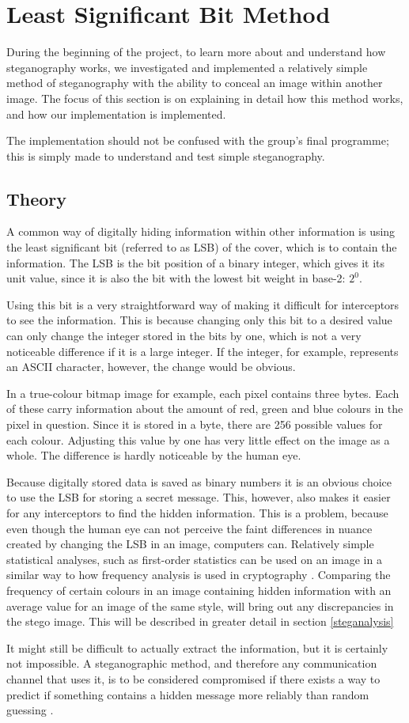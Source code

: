 \section{Least Significant Bit Method}
During the beginning of the project, to learn more about and understand how steganography works, we investigated and implemented a relatively simple method of steganography with the ability to conceal an image within another image.
The focus of this section is on explaining in detail how this method works, and how our implementation is implemented.

The implementation should not be confused with the group's final programme; this is simply made to understand and test simple steganography.

\subsection{Theory}
A common way of digitally hiding information within other information is using the least significant bit (referred to as LSB) of the cover, which is to contain the information.
The LSB is the bit position of a binary integer, which gives it its unit value, since it is also the bit with the lowest bit weight in base-2: $2^0$.

Using this bit is a very straightforward way of making it difficult for interceptors to see the information.
This is because changing only this bit to a desired value can only change the integer stored in the bits by one, which is not a very noticeable difference if it is a large integer.
If the integer, for example, represents an ASCII character, however, the change would be obvious.

In a true-colour bitmap image for example, each pixel contains three bytes.
Each of these carry information about the amount of red, green and blue colours in the pixel in question.
Since it is stored in a byte, there are 256 possible values for each colour.
Adjusting this value by one has very little effect on the image as a whole.
The difference is hardly noticeable by the human eye.

Because digitally stored data is saved as binary numbers it is an obvious choice to use the LSB for storing a secret message.
This, however, also makes it easier for any interceptors to find the hidden information.
This is a problem, because even though the human eye can not perceive the faint differences in nuance created by changing the LSB in an image, computers can.
Relatively simple statistical analyses, such as first-order statistics can be used on an image in a similar way to how frequency analysis is used in cryptography \citep{Hetzl2005}.
Comparing the frequency of certain colours in an image containing hidden information with an average value for an image of the same style, will bring out any discrepancies in the stego image.
This will be described in greater detail in section \ref{steganalysis}

It might still be difficult to actually extract the information, but it is certainly not impossible.
A steganographic method, and therefore any communication channel that uses it, is to be considered compromised if there exists a way to predict if something contains a hidden message more reliably than random guessing \citep{Bohme2004}.
